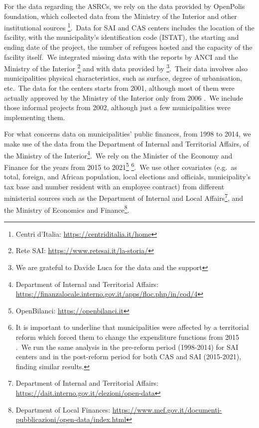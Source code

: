 \documentclass[authoryear,preprint,review,12pt]{elsarticle}
\begin{document}
\noindent
For the data regarding the ASRCs, we rely on the data provided by OpenPolis foundation, which collected data from the Ministry of the Interior and other institutional sources \footnote{Centri d'Italia: \url{https://centriditalia.it/home}}.\ Data for SAI and CAS centers includes the location of the facility, with the municipality's identification code (ISTAT), the starting and ending date of the project, the number of refugees hosted and the capacity of the facility itself.\ We integrated missing data with the reports by ANCI and the Ministry of the Interior \footnote{Rete SAI: \url{https://www.retesai.it/la-storia/}} and with data provided by \cite{proietti2022}\footnote{We are grateful to Davide Luca for the data and the support}.\ Their data involves also municipalities physical characteristics, such as surface, degree of urbanisation, etc.\ The data for the centers starts from 2001, although most of them were actually approved by the Ministry of the Interior only from 2006 \citep{marchetti2014}.\ We include those informal projects from 2002, although just a few municipalities were implementing them.\\  

\vspace{2pt}

\noindent
For what concerns data on municipalities' public finances, from 1998 to 2014, we make use of the data from the Department of Internal and Territorial Affairs, of the Ministry of the Interior\footnote{Department of Internal and Territorial Affairs: \url{https://finanzalocale.interno.gov.it/apps/floc.php/in/cod/4}}.\ We rely on the Minister of the Economy and Finance for the years from 2015 to 2021\footnote{OpenBilanci: \url{https://openbilanci.it}} \footnote{It is important to underline that municipalities were affected by a territorial reform which forced them to change the expenditure functions from 2015 \citep{bolgherini2016}.\ We run the same analysis in the pre-reform period (1998-2014) for SAI centers and in the post-reform period for both CAS and SAI (2015-2021), finding similar results.}.\ We use other covariates (e.g.\ as total, foreign, and African population, local elections and officials, municipality's tax base and number resident with an employee contract) from different ministerial sources such as the Department of Internal and Local Affairs\footnote{Department of Internal and Territorial Affairs: \url{https://dait.interno.gov.it/elezioni/open-data}}, and the Ministry of Economics and Finance\footnote{Department of Local Finances: \url{https://www.mef.gov.it/documenti-pubblicazioni/open-data/index.html}}.\\ 
\end{document}
